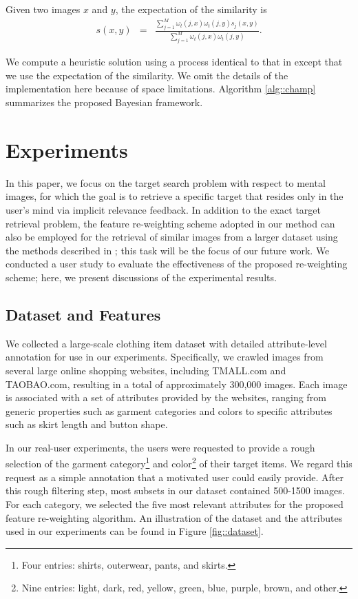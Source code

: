 \documentclass[journal]{IEEEtran}
\begin{document}
Given two images $x$ and $y$, the expectation of the similarity is
\begin{eqnarray}
s(x,y)&=&\frac{\sum_{j=1}^M \omega_t(j,x)\omega_t(j,y)s_j(x,y)}{\sum_{j=1}^M \omega_t(j,x)\omega_t(j,y)}.
\end{eqnarray}

We compute a heuristic solution using a process identical to that in \cite{fang2005experiments} except that we use the expectation of the similarity. We omit the details of the implementation here because of space limitations. Algorithm \ref{alg::champ} summarizes the proposed Bayesian framework.



\section{Experiments}\label{sec::exp}
In this paper, we focus on the target search problem with respect to mental images, for which the goal is to retrieve a specific target that resides only in the user's mind via implicit relevance feedback. In addition to the exact target retrieval problem, the feature re-weighting scheme adopted in our method can also be employed for the retrieval of similar images from a larger dataset using the methods described in \cite{ferecatu2007interactive,suditu2011heat}; this task will be the focus of our future work. We conducted a user study to evaluate the effectiveness of the proposed re-weighting scheme; here, we present discussions of the experimental results.


\subsection{Dataset and Features}\label{subsec::dataset}
We collected a large-scale clothing item dataset with detailed attribute-level annotation for use in our experiments. Specifically, we crawled images from several large online shopping websites, including TMALL.com and TAOBAO.com, resulting in a total of approximately 300,000 images. Each image is associated with a set of attributes provided by the websites, ranging from generic properties such as garment categories and colors to specific attributes such as skirt length and button shape.

In our real-user experiments, the users were requested to provide a rough selection of the garment category\footnote{Four entries: shirts, outerwear, pants, and skirts.} and color\footnote{Nine entries: light, dark, red, yellow, green, blue, purple, brown, and other.} of their target items. We regard this request as a simple annotation that a motivated user could easily provide. After this rough filtering step, most subsets in our dataset contained 500-1500 images. For each category, we selected the five most relevant attributes for the proposed feature re-weighting algorithm. An illustration of the dataset and the attributes used in our experiments can be found in Figure \ref{fig::dataset}.
\end{document}
